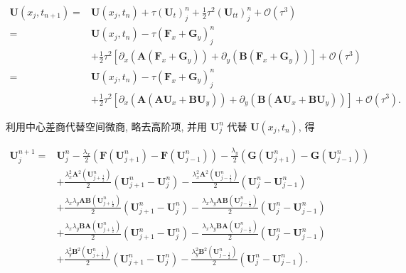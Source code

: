 \documentclass[12pt]{article}
\begin{document}
\begin{align}
\bm{U}\left(x_{j}, t_{n+1}\right) =&\bm{U}\left(x_{j}, t_{n}\right)+\tau\left(\bm{U}_{t}\right)_{j}^{n}+\frac{1}{2} \tau^{2}\left(\bm{U}_{t t}\right)_{j}^{n}+\mathcal{O}\left(\tau^{3}\right) \\
=&\bm{U}\left(x_{j}, t_{n}\right)-\tau\left(\bm{F}_{x}+\bm{G}_y\right)_{j}^{n}\\
& +\frac{1}{2} \tau^{2} \left[\partial_{x}\left(\bm{A}\left(\bm{F}_{x}+\bm{G}_y\right) \right)+\partial_{y}\left(\bm{B}\left(\bm{F}_{x}+\bm{G}_y\right) \right)\right]+\mathcal{O}\left(\tau^{3}\right) \\
=&\bm{U}\left(x_{j}, t_{n}\right)-\tau\left(\bm{F}_{x}+\bm{G}_y\right)_{j}^{n}\\
&+\frac{1}{2} \tau^{2} \left[\partial_{x}\left(\bm{A}\left(\bm{A}\bm{U}_{x}+\bm{B}\bm{U}_{y}\right) \right)+\partial_{y}\left(\bm{B}\left(\bm{A}\bm{U}_{x}+\bm{B}\bm{U}_{y}\right) \right)\right]+\mathcal{O}\left(\tau^{3}\right).
\end{align}

利用中心差商代替空间微商, 略去高阶项, 并用 $\bm{U}_{j}^{n}$ 代替 $\bm{U}\left(x_{j}, t_{n}\right)$, 得

\begin{align}
\bm{U}_{j}^{n+1}=& \bm{U}_{j}^{n}-\frac{\lambda_x}{2}\left(\bm{F}\left(\bm{U}_{j+1}^{n}\right)-\bm{F}\left(\bm{U}_{j-1}^{n}\right)\right)-\frac{\lambda_y}{2}\left(\bm{G}\left(\bm{U}_{j+1}^{n}\right)-\bm{G}\left(\bm{U}_{j-1}^{n}\right)\right) \\
&+\frac{\lambda_x^{2} \bm{A}^{2}\left(\bm{U}_{j+\frac{1}{2}}^{n}\right)}{2}\left(\bm{U}_{j+1}^{n}-\bm{U}_{j}^{n}\right)-\frac{\lambda_x^{2} \bm{A}^{2}\left(\bm{U}_{j-\frac{1}{2}}^{n}\right)}{2}\left(\bm{U}_{j}^{n}-\bm{U}_{j-1}^{n}\right)\\
&+\frac{\lambda_x\lambda_y \bm{A}\bm{B}\left(\bm{U}_{j+\frac{1}{2}}^{n}\right)}{2}\left(\bm{U}_{j+1}^{n}-\bm{U}_{j}^{n}\right)-\frac{\lambda_x\lambda_y \bm{A}\bm{B}\left(\bm{U}_{j-\frac{1}{2}}^{n}\right)}{2}\left(\bm{U}_{j}^{n}-\bm{U}_{j-1}^{n}\right)\\
&+\frac{\lambda_x\lambda_y \bm{B}\bm{A}\left(\bm{U}_{j+\frac{1}{2}}^{n}\right)}{2}\left(\bm{U}_{j+1}^{n}-\bm{U}_{j}^{n}\right)-\frac{\lambda_x\lambda_y \bm{B}\bm{A}\left(\bm{U}_{j-\frac{1}{2}}^{n}\right)}{2}\left(\bm{U}_{j}^{n}-\bm{U}_{j-1}^{n}\right)\\
&+\frac{\lambda_y^{2} \bm{B}^{2}\left(\bm{U}_{j+\frac{1}{2}}^{n}\right)}{2}\left(\bm{U}_{j+1}^{n}-\bm{U}_{j}^{n}\right)-\frac{\lambda_y^{2} \bm{B}^{2}\left(\bm{U}_{j-\frac{1}{2}}^{n}\right)}{2}\left(\bm{U}_{j}^{n}-\bm{U}_{j-1}^{n}\right).
\end{align}
\end{document}
